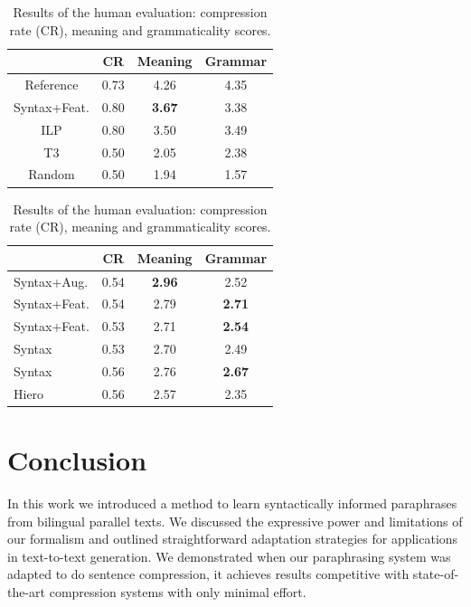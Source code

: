 \documentclass[11pt]{article}
\begin{document}
\begin{table}
\small
\begin{center}
\begin{tabular}{|c|c|c|c|}
  \hline
  & CR & Meaning & Grammar \\
  \hline
  Reference & 0.73 &  4.26 & 4.35 \\
  \hline
  \hline
  Syntax+Feat. & 0.80 & {\bf 3.67} & 3.38 \\
  ILP & 0.80 & 3.50 & 3.49 \\
  \hline
  \hline
  T3 & 0.50 & 2.05 & 2.38 \\
  \hline
  Random & 0.50 & 1.94 & 1.57 \\
  \hline
\end{tabular}
\end{center}
\normalsize
\caption{Results of the human evaluation: compression rate (CR),
  meaning and grammaticality scores. 
  }
\label{human_judgments}
\end{table}


\begin{table}
\small
\begin{center}
\begin{tabular}{|l|c|c|c|}
  \hline
  & CR & Meaning & Grammar \\
  \hline
  Syntax+Aug. & 0.54 & {\bf 2.96} & 2.52 \\
  Syntax+Feat. & 0.54 & 2.79 & {\bf 2.71} \\
  \hline
  \hline
  Syntax+Feat.& 0.53 & 2.71 & {\bf 2.54} \\
  Syntax & 0.53 & 2.70 & 2.49 \\
  \hline
  \hline
  Syntax & 0.56 & 2.76 & {\bf 2.67} \\
  Hiero & 0.56 & 2.57 & 2.35 \\
  \hline
\end{tabular}
\end{center}
\normalsize
\caption{Results of the human evaluation: compression rate (CR),
  meaning and grammaticality scores. 
  }
\label{comparison}
\end{table}

\section{Conclusion} \label{conclusion}

In this work we introduced a method to learn syntactically informed
paraphrases from bilingual parallel texts. We discussed the expressive
power and limitations of our formalism and outlined straightforward
adaptation strategies for applications in text-to-text generation. We
demonstrated when our paraphrasing system was adapted to do sentence
compression, it achieves results competitive with state-of-the-art
compression systems with only minimal effort.
\end{document}
